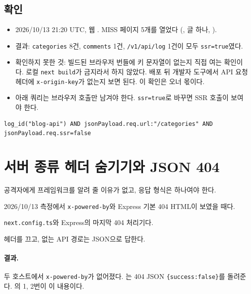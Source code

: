 \subsection{확인}\label{sec:05-clientrequest-verify}

\begin{itemize}[nosep]
  \item 2026/10/13 21:20 UTC, 웹 . MISS 페이지 5개를 열었다 (, 글 하나, ).
  \item 결과: \texttt{categories} 8건, \texttt{comments} 1건, \texttt{/v1/api/log} 1건이 모두 \texttt{ssr=true}였다.
  \item 확인하지 못한 것: 빌드된 브라우저 번들에 키 문자열이 없는지 직접 여는 확인이다. 로컬 \texttt{next build}가 금지라서 하지 않았다. 배포 뒤 개발자 도구에서 API 요청 헤더에 \texttt{x-origin-key}가 없는지 보면 된다. 이 확인은 오너 몫이다.
  \item 아래 쿼리는 브라우저 호출만 남겨야 한다. \texttt{ssr=true}로 바꾸면 SSR 호출이 보여야 한다.
\end{itemize}

\begin{lstlisting}
log_id("blog-api") AND jsonPayload.req.url:"/categories" AND jsonPayload.req.ssr=false
\end{lstlisting}

\section{서버 종류 헤더 숨기기와 JSON 404}\label{sec:05-headers}

\begin{inbrief}
  \item[Why] 공격자에게 프레임워크를 알려 줄 이유가 없고, 응답 형식은 하나여야 한다.
  \item[When] 2026/10/13 측정에서 \texttt{x-powered-by}와 Express 기본 404 HTML이 보였을 때다.
  \item[Where] \texttt{next.config.ts}와 Express의 마지막 404 처리기다.
  \item[How] 헤더를 끄고, 없는 API 경로는 JSON으로 답한다.
\end{inbrief}

\paragraph{결과.}
두 호스트에서 \texttt{x-powered-by}가 없어졌다.
는 404 JSON \texttt{\{success:false\}}를 돌려준다.
의 1, 2번이 이 내용이다.

